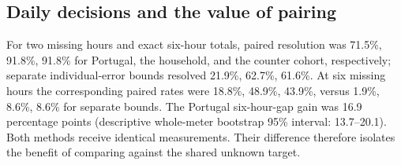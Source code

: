 \documentclass[12pt]{article}
\begin{document}
\subsection{Daily decisions and the value of pairing}\label{app:restricted-daily}
For two missing hours and exact six-hour totals, paired resolution was
71.5\%, 91.8\%, 91.8\% for Portugal, the household,
and the counter cohort, respectively; separate individual-error bounds
resolved 21.9\%, 62.7\%, 61.6\%. At six missing
hours the corresponding paired rates were 18.8\%, 48.9\%, 43.9\%,
versus 1.9\%, 8.6\%, 8.6\% for separate bounds.
The Portugal six-hour-gap gain was 16.9
percentage points (descriptive whole-meter bootstrap 95\% interval:
13.7--20.1).
Both methods receive identical measurements. Their difference therefore
isolates the benefit of comparing against the shared unknown target.
\end{document}
